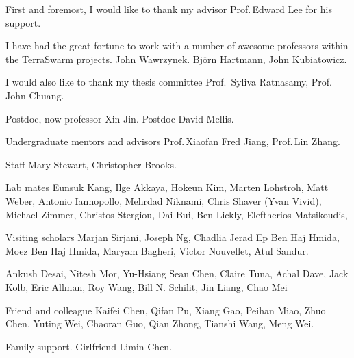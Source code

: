 \begin{acknowledgements}

  First and foremost, I would like to thank my advisor Prof.\,Edward Lee for his
  support.

  I have had the great fortune to work with a number of awesome professors
  within the TerraSwarm projects. John Wawrzynek.  Bj\"orn Hartmann, John
  Kubiatowicz.

  I would also like to thank my thesis committee Prof.\, Syliva Ratnasamy,
  Prof.\, John Chuang.

  Postdoc, now professor Xin Jin. Postdoc David Mellis.

  Undergraduate mentors and advisors Prof.\,Xiaofan Fred Jiang, Prof.\,Lin
  Zhang.

  Staff Mary Stewart, Christopher Brooks.


  Lab mates Eunsuk Kang, Ilge Akkaya, Hokeun Kim, Marten Lohstroh, Matt Weber,
  Antonio Iannopollo, Mehrdad Niknami, Chris Shaver (Yvan Vivid), Michael
  Zimmer, Christos Stergiou, Dai Bui, Ben Lickly, Eleftherios Matsikoudis,

  Visiting scholars Marjan Sirjani, Joseph Ng, Chadlia Jerad Ep Ben Haj Hmida,
  Moez Ben Haj Hmida, Maryam Bagheri, Victor Nouvellet, Atul Sandur.

  Ankush Desai, Nitesh Mor, Yu-Hsiang Sean Chen, Claire Tuna, Achal Dave, Jack
  Kolb, Eric Allman, Roy Wang, Bill N. Schilit, Jin Liang, Chao Mei

  Friend and colleague Kaifei Chen, Qifan Pu, Xiang Gao, Peihan Miao, Zhuo Chen,
  Yuting Wei, Chaoran Guo, Qian Zhong, Tianshi Wang, Meng Wei.

  Family support. Girlfriend Limin Chen.

\end{acknowledgements}

